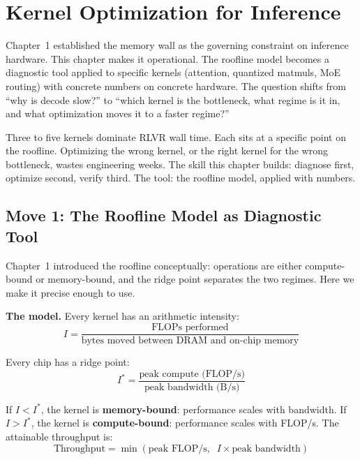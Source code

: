 \section*{Kernel Optimization for Inference}

\smallskip

\begin{whythis}
Chapter~1 established the memory wall as the governing constraint on inference hardware. This chapter makes it operational. The roofline model becomes a diagnostic tool applied to specific kernels (attention, quantized matmuls, MoE routing) with concrete numbers on concrete hardware. The question shifts from ``why is decode slow?'' to ``which kernel is the bottleneck, what regime is it in, and what optimization moves it to a faster regime?''

Three to five kernels dominate RLVR wall time. Each sits at a specific point on the roofline. Optimizing the wrong kernel, or the right kernel for the wrong bottleneck, wastes engineering weeks. The skill this chapter builds: diagnose first, optimize second, verify third. The tool: the roofline model, applied with numbers.
\end{whythis}

\subsection*{Move 1: The Roofline Model as Diagnostic Tool}

Chapter~1 introduced the roofline conceptually: operations are either compute-bound or memory-bound, and the ridge point separates the two regimes. Here we make it precise enough to use.

\textbf{The model.} Every kernel has an arithmetic intensity:
$$I = \frac{\text{FLOPs performed}}{\text{bytes moved between DRAM and on-chip memory}}$$

Every chip has a ridge point:
$$I^* = \frac{\text{peak compute (FLOP/s)}}{\text{peak bandwidth (B/s)}}$$

If $I < I^*$, the kernel is \textbf{memory-bound}: performance scales with bandwidth. If $I > I^*$, the kernel is \textbf{compute-bound}: performance scales with FLOP/s. The attainable throughput is:
$$\text{Throughput} = \min\left(\text{peak FLOP/s},\;\; I \times \text{peak bandwidth}\right)$$

